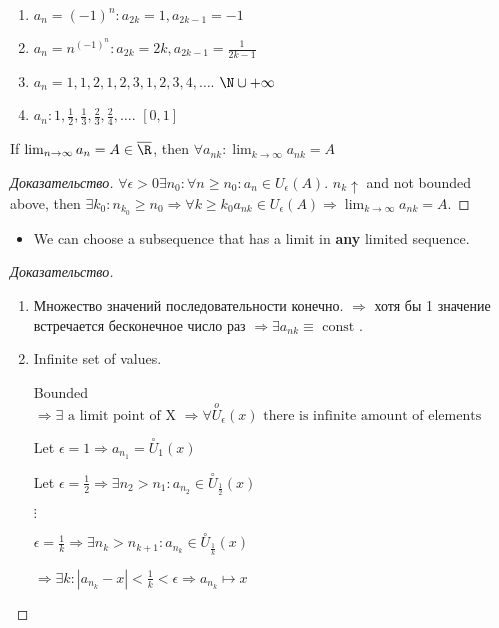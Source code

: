 \begin{example}[]
	\begin{enumerate}
		\item $a_n = (-1)^{n}: a_{2k} = 1, a_{2k-1} = -1$
		\item $a_{n} = n^{(-1)^{n}}: a_{2k} = 2k, a_{2k-1} = \frac{1}{2k-1}$ 
		\item $a_n = 1,1,2,1,2,3,1,2,3,4, \dots $. $\N \cup +\infty$
		\item $a_n: 1, \frac{1}{2}, \frac{1}{3}, \frac{2}{3}, \frac{2}{4}, \dots $. $\left[ 0,1 \right]$ 
	\end{enumerate}
\end{example}

\begin{lemma}
	If $\lim_{n \to \infty} a_n = A \in \overline{\R}$, then $\forall a_{nk}: \lim_{k \to \infty} a_{nk} = A$
\end{lemma}

\begin{proof}[Доказательство]
	$\forall \epsilon > 0 \exists n_0: \forall n \geq n_0: a_n \in U_{\epsilon}(A)$. $n_k \uparrow$ and not bounded above, then  $\exists k_0: n_{k_0} \geq n_0 \Rightarrow \forall k \geq k_0 a_{nk} \in U_\epsilon(A) \Rightarrow \lim_{k \to \infty} a_{nk} = A$.
\end{proof}

\begin{theorem}
	\begin{itemize}
		\item We can choose a subsequence that has a limit in \textbf{any} limited sequence.
	\end{itemize}
\end{theorem}

\begin{proof}[Доказательство]
	\begin{enumerate}
		\item Множество значений последовательности конечно. $ \Rightarrow $ хотя бы 1 значение встречается бесконечное число раз $ \Rightarrow \exists a_{nk} \equiv \text{ const } $.
		\item Infinite set of values.

			Bounded $ \Rightarrow \exists \text{ a limit point of X } \Rightarrow \forall  \overset{o}U_\epsilon (x) \text{ there is infinite amount of elements }  $ 

			Let $\epsilon = 1 \Rightarrow a_{n_1} =  \overset{\circ}U _1 (x) $

			Let $\epsilon = \frac{1}{2} \Rightarrow \exists n_2 > n_1: a_{n_2} \in  \overset{\circ}U_{\frac{1}{2}}(x) $

			$\vdots$

			 $\epsilon = \frac{1}{k} \Rightarrow \exists n_k > n_{k+1}: a_{n_k} \in  \overset{\circ}U_{\frac{1}{k}} (x) $

			 $ \Rightarrow  \exists k: \left| a_{n_k} - x \right| < \frac{1}{k} < \epsilon \Rightarrow a_{n_k} \mapsto x $
	\end{enumerate}
\end{proof}

